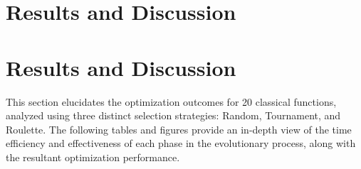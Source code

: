 \section{Results and Discussion}
\label{sec:fn_opt:results}

\section{Results and Discussion}
\label{sec:fn_opt:results}

  This section elucidates the optimization outcomes for 20 classical functions, 
  analyzed using three distinct selection strategies: Random, Tournament, and 
  Roulette. The following tables and figures provide an in-depth view of the 
  time efficiency and effectiveness of each phase in the evolutionary process, 
  along with the resultant optimization performance.

